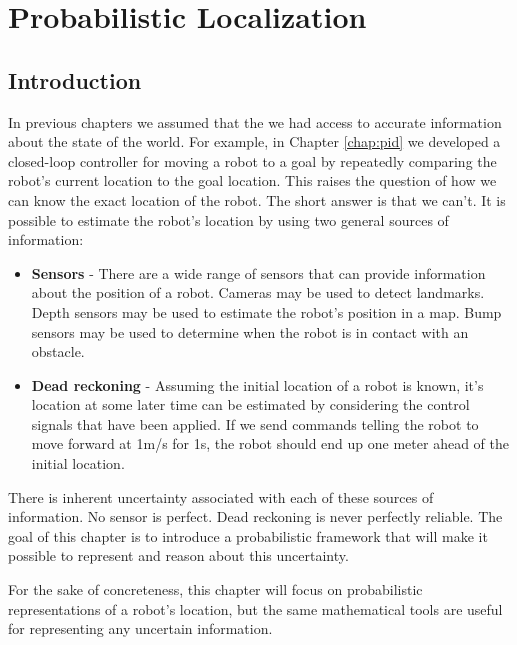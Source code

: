 \chapter{Probabilistic Localization}



\section{Introduction}
In previous chapters we assumed that the we had access to accurate
information about the state of the world.  For example, in Chapter
\ref{chap:pid} we developed a closed-loop controller for moving a
robot to a goal by repeatedly comparing the robot's current location
to the goal location.  This raises the question of how we can know the
exact location of the robot.  The short answer is that we can't.  It
is possible to estimate the robot's location by using two general
sources of information:

\begin{itemize}
\item \textbf{Sensors} - There are a wide range of sensors that can
  provide information about the position of a robot.  Cameras may be
  used to detect landmarks.  Depth sensors may be used to estimate the
  robot's position in a map.  Bump sensors may be used to determine
  when the robot is in contact with an obstacle.
  
\item \textbf{Dead reckoning} - Assuming the initial location of a robot is
  known, it's location at some later time can be estimated by
  considering the control signals that have been applied.  If we send
  commands telling the robot to move forward at 1m/s for 1s, the robot
  should end up one meter ahead of the initial location.
\end{itemize}

There is inherent uncertainty associated with each of these sources of
information. No sensor is perfect. Dead reckoning is never perfectly
reliable. The goal of this chapter is to introduce a probabilistic
framework that will make it possible to represent and reason about
this uncertainty.




For the sake of concreteness, this chapter will focus on probabilistic
representations of a robot's location, but the same mathematical tools
are useful for representing any uncertain information.



